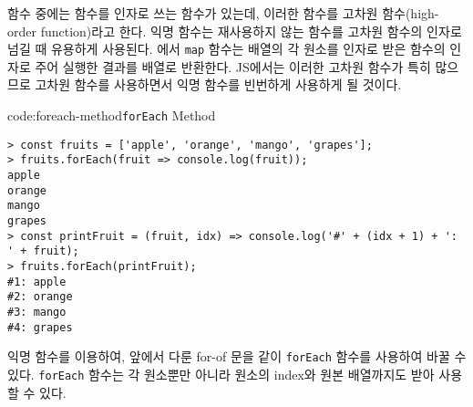 함수 중에는 함수를 인자로 쓰는 함수가 있는데, 이러한 함수를 고차원 함수(high-order function)라고 한다. 익명 함수는 재사용하지 않는 함수를 고차원 함수의 인자로 넘길 때 유용하게 사용된다. 에서 \texttt{map} 함수는 배열의 각 원소를 인자로 받은 함수의 인자로 주어 실행한 결과를 배열로 반환한다. JS에서는 이러한 고차원 함수가 특히 많으므로 고차원 함수를 사용하면서 익명 함수를 빈번하게 사용하게 될 것이다.

\begin{codeenv}{code:foreach-method}{\texttt{forEach} Method}\begin{verbatim}
> const fruits = ['apple', 'orange', 'mango', 'grapes'];
> fruits.forEach(fruit => console.log(fruit));
apple
orange
mango
grapes
> const printFruit = (fruit, idx) => console.log('#' + (idx + 1) + ': ' + fruit);
> fruits.forEach(printFruit);
#1: apple
#2: orange
#3: mango
#4: grapes
\end{verbatim}
\end{codeenv}

익명 함수를 이용하여, 앞에서 다룬 for-of 문을 \와 같이 \texttt{forEach} 함수를 사용하여 바꿀 수 있다. \texttt{forEach} 함수는 각 원소뿐만 아니라 원소의 index와 원본 배열까지도 받아 사용할 수 있다.
